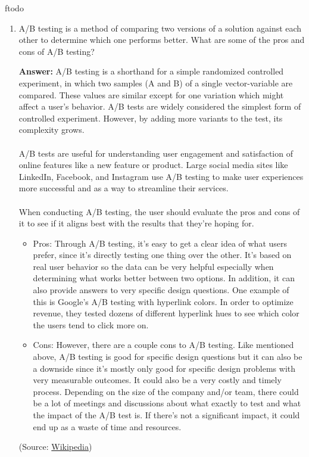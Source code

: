 ƒtodo\documentclass{article}
\newenvironment{QandA}{\begin{enumerate}[label=\arabic*.]}{\end{enumerate}}
\newenvironment{InnerQandA}{\begin{enumerate}[label=\roman*.]}{\end{enumerate}}
\newenvironment{answer}{\par\normalfont \textbf{Answer:}}{}
\begin{document}
\begin{QandA}
\begin{InnerQandA}
\begin{answer}
            (See more \href{https://stats.stackexchange.com/questions/73646/how-do-i-test-that-two-continuous-variables-are-independent}{here})
        \end{answer}
    \end{InnerQandA}

    \item A/B testing is a method of comparing two versions of a solution against each other to determine which one performs better. What are some of the pros and cons of A/B testing?
    \begin{answer}
        A/B testing is a shorthand for a simple randomized controlled experiment, in which two samples (A and B) of a single vector-variable are compared. These values are similar except for one variation which might affect a user's behavior. A/B tests are widely considered the simplest form of controlled experiment. However, by adding more variants to the test, its complexity grows. \\\\
        A/B tests are useful for understanding user engagement and satisfaction of online features like a new feature or product. Large social media sites like LinkedIn, Facebook, and Instagram use A/B testing to make user experiences more successful and as a way to streamline their services.\\\\
        When conducting A/B testing, the user should evaluate the pros and cons of it to see if it aligns best with the results that they’re hoping for.
        \begin{itemize}
            \item Pros: Through A/B testing, it’s easy to get a clear idea of what users prefer, since it’s directly testing one thing over the other. It’s based on real user behavior so the data can be very helpful especially when determining what works better between two options. In addition, it can also provide answers to very specific design questions. One example of this is Google's A/B testing with hyperlink colors. In order to optimize revenue, they tested dozens of different hyperlink hues to see which color the users tend to click more on.
            \item Cons: However, there are a couple cons to A/B testing. Like mentioned above, A/B testing is good for specific design questions but it can also be a downside since it’s mostly only good for specific design problems with very measurable outcomes. It could also be a very costly and timely process. Depending on the size of the company and/or team, there could be a lot of meetings and discussions about what exactly to test and what the impact of the A/B test is. If there’s not a significant impact, it could end up as a waste of time and resources.
        \end{itemize}
        (Source: \href{https://en.wikipedia.org/wiki/A/B_testing}{Wikipedia})
    \end{answer}


\end{QandA}
\end{document}
